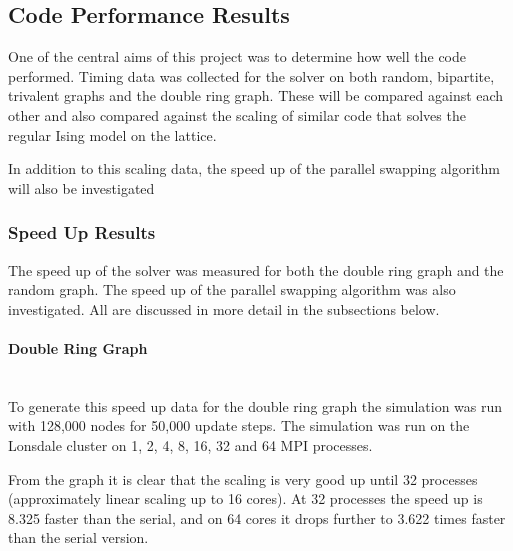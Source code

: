 \documentclass[pdftex,12pt,a4paper]{article}
\begin{document}

\subsection{Code Performance Results}

One of the central aims of this project was to determine how well the code performed. Timing data was collected for the solver on both random, bipartite, trivalent graphs and the double ring graph. These will be compared against each other and also compared against the scaling of similar code that solves the regular Ising model on the lattice.

In addition to this scaling data, the speed up of the parallel swapping algorithm will also be investigated


\subsubsection{Speed Up Results}

The speed up of the solver was measured for both the double ring graph and the random graph. The speed up of the parallel swapping algorithm was also investigated. All are discussed in more detail in the subsections below.

\paragraph{Double Ring Graph} ~\\

To generate this speed up data for the double ring graph the simulation was run with 128,000 nodes for 50,000 update steps. The simulation was run on the Lonsdale cluster on 1, 2, 4, 8, 16, 32 and 64 MPI processes.

From the graph it is clear that the scaling is very good up until 32 processes (approximately linear scaling up to 16 cores). At 32 processes the speed up is 8.325 faster than the serial, and on 64 cores it drops further to 3.622 times faster than the serial version.
\end{document}
